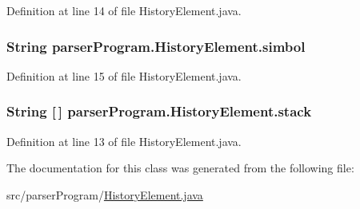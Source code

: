 Definition at line 14 of file History\-Element.\-java.

\hypertarget{classparser_program_1_1_history_element_a3c9ad24a6a0f33ac5d1cbc95ff1e82de}{
\subsubsection[{simbol}]{\setlength{\rightskip}{0pt plus 5cm}String {\bf parser\-Program.\-History\-Element.\-simbol}}}\label{classparser_program_1_1_history_element_a3c9ad24a6a0f33ac5d1cbc95ff1e82de}


Definition at line 15 of file History\-Element.\-java.

\hypertarget{classparser_program_1_1_history_element_a3ab04c9be50cda70dcfd9ee134884d9f}{
\subsubsection[{stack}]{\setlength{\rightskip}{0pt plus 5cm}String \mbox{[}$\,$\mbox{]} {\bf parser\-Program.\-History\-Element.\-stack}}}\label{classparser_program_1_1_history_element_a3ab04c9be50cda70dcfd9ee134884d9f}


Definition at line 13 of file History\-Element.\-java.



The documentation for this class was generated from the following file\-:\begin{DoxyCompactItemize}
\item 
src/parser\-Program/\hyperlink{_history_element_8java}{History\-Element.\-java}\end{DoxyCompactItemize}
